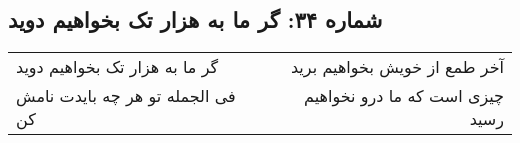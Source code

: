 \begin{center}
\section*{شماره ۳۴: گر ما به هزار تک بخواهیم دوید}
\label{sec:034}
\begin{longtable}{l p{0.5cm} r}
گر ما به هزار تک بخواهیم دوید
&&
آخر طمع از خویش بخواهیم برید
\\
فی الجمله تو هر چه بایدت نامش کن
&&
چیزی است که ما درو نخواهیم رسید
\\
\end{longtable}
\end{center}
